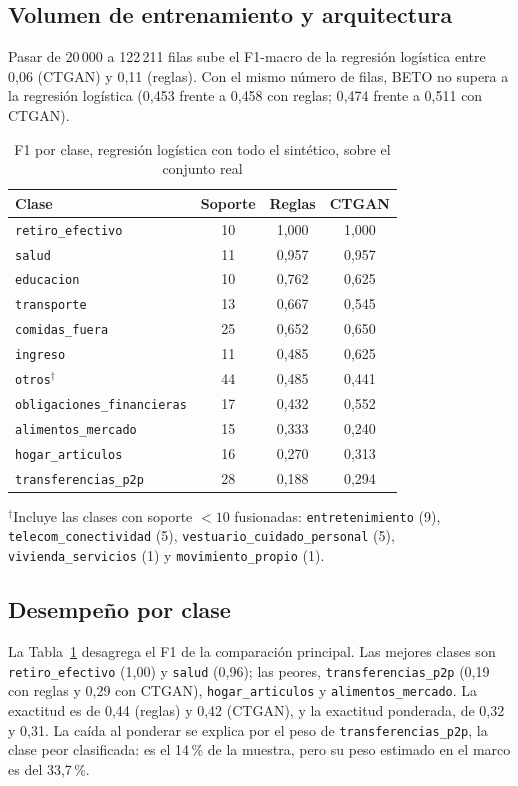\documentclass[journal]{IEEEtai}
\begin{document}
\subsection{Volumen de entrenamiento y arquitectura}
Pasar de 20\,000 a 122\,211 filas sube el F1-macro de la regresión logística entre 0{,}06 (CTGAN) y 0{,}11 (reglas). Con el mismo número de filas, BETO no supera a la regresión logística (0{,}453 frente a 0{,}458 con reglas; 0{,}474 frente a 0{,}511 con CTGAN).

\begin{table}[!t]
\caption{F1 por clase, regresión logística con todo el sintético, sobre el conjunto real}
\label{tab:por_clase}
\centering
\footnotesize
\begin{tabular}{lccc}
\toprule
Clase & Soporte & Reglas & CTGAN \\
\midrule
\texttt{retiro\_efectivo} & 10 & 1{,}000 & 1{,}000 \\
\texttt{salud} & 11 & 0{,}957 & 0{,}957 \\
\texttt{educacion} & 10 & 0{,}762 & 0{,}625 \\
\texttt{transporte} & 13 & 0{,}667 & 0{,}545 \\
\texttt{comidas\_fuera} & 25 & 0{,}652 & 0{,}650 \\
\texttt{ingreso} & 11 & 0{,}485 & 0{,}625 \\
\texttt{otros}$^{\dagger}$ & 44 & 0{,}485 & 0{,}441 \\
\texttt{obligaciones\_financieras} & 17 & 0{,}432 & 0{,}552 \\
\texttt{alimentos\_mercado} & 15 & 0{,}333 & 0{,}240 \\
\texttt{hogar\_articulos} & 16 & 0{,}270 & 0{,}313 \\
\texttt{transferencias\_p2p} & 28 & 0{,}188 & 0{,}294 \\
\bottomrule
\end{tabular}
\par\smallskip\footnotesize $^{\dagger}$Incluye las clases con soporte $<10$ fusionadas: \texttt{entretenimiento} (9), \texttt{telecom\_conectividad} (5), \texttt{vestuario\_cuidado\_personal} (5), \texttt{vivienda\_servicios} (1) y \texttt{movimiento\_propio} (1).
\end{table}

\subsection{Desempeño por clase}
La Tabla~\ref{tab:por_clase} desagrega el F1 de la comparación principal. Las mejores clases son \texttt{retiro\_efectivo} (1{,}00) y \texttt{salud} (0{,}96); las peores, \texttt{transferencias\_p2p} (0{,}19 con reglas y 0{,}29 con CTGAN), \texttt{hogar\_articulos} y \texttt{alimentos\_mercado}. La exactitud es de 0{,}44 (reglas) y 0{,}42 (CTGAN), y la exactitud ponderada, de 0{,}32 y 0{,}31. La caída al ponderar se explica por el peso de \texttt{transferencias\_p2p}, la clase peor clasificada: es el 14\,\% de la muestra, pero su peso estimado en el marco es del 33{,}7\,\%.
\end{document}
